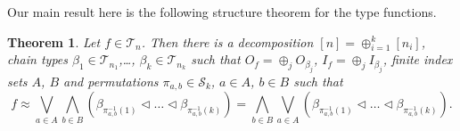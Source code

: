 \documentclass[12pt]{article}
\newtheorem{theorem}{Theorem}
\theoremstyle{definition}
\theoremstyle{remark}
\def\Te{\mathcal T}
\def\permut{\mathscr{S}}
\def\vtl{\vartriangleleft}
\begin{document}
Our main result here is the  following structure theorem for the type functions.


\begin{theorem}\label{thm:structure}
Let  $f\in \Te_n$. Then there is  a decomposition
$[n]=\oplus_{i=1}^k[n_i]$, chain types 
$\beta_1\in \Te_{n_1}$,\dots, $\beta_k\in
\Te_{n_k}$ such that $O_f=\oplus_j O_{\beta_j}$, $I_f=\oplus_j I_{\beta_j}$, finite index sets $A$, $B$ and permutations $\pi_{a,b}\in
\permut_k$, $a\in A$, $b\in B$ such that 
\[
f\approx \bigvee_{a\in A}\bigwedge_{b\in B} (\beta_{\pi^{-1}_{a,b}(1)}\vtl \dots \vtl
\beta_{\pi^{-1}_{a,b}(k)})=\bigwedge_{b\in B}\bigvee_{a\in A}(\beta_{\pi^{-1}_{a,b}(1)}\vtl \dots \vtl
\beta_{\pi^{-1}_{a,b}(k)}).
\]
%
\end{theorem}
\end{document}
